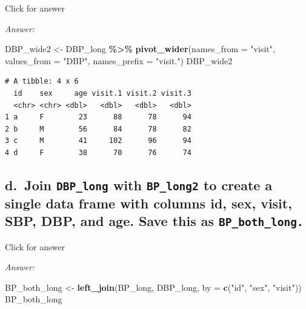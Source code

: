 \documentclass[
]{book}
\newenvironment{Shaded}{\begin{snugshade}}{\end{snugshade}}
\newcommand{\AttributeTok}[1]{\textcolor[rgb]{0.13,0.29,0.53}{#1}}
\newcommand{\FunctionTok}[1]{\textcolor[rgb]{0.13,0.29,0.53}{\textbf{#1}}}
\newcommand{\NormalTok}[1]{#1}
\newcommand{\OtherTok}[1]{\textcolor[rgb]{0.56,0.35,0.01}{#1}}
\newcommand{\SpecialCharTok}[1]{\textcolor[rgb]{0.81,0.36,0.00}{\textbf{#1}}}
\newcommand{\StringTok}[1]{\textcolor[rgb]{0.31,0.60,0.02}{#1}}
\begin{document}
Click for answer

\emph{Answer:}

\begin{Shaded}
\begin{Highlighting}[]
\NormalTok{DBP\_wide2 }\OtherTok{\textless{}{-}}\NormalTok{ DBP\_long }\SpecialCharTok{\%\textgreater{}\%} 
  \FunctionTok{pivot\_wider}\NormalTok{(}\AttributeTok{names\_from =} \StringTok{"visit"}\NormalTok{,}
              \AttributeTok{values\_from =} \StringTok{"DBP"}\NormalTok{,}
              \AttributeTok{names\_prefix =} \StringTok{"visit."}\NormalTok{)}
\NormalTok{DBP\_wide2}
\end{Highlighting}
\end{Shaded}

\begin{verbatim}
# A tibble: 4 x 6
  id    sex     age visit.1 visit.2 visit.3
  <chr> <chr> <dbl>   <dbl>   <dbl>   <dbl>
1 a     F        23      88      78      94
2 b     M        56      84      78      82
3 c     M        41     102      96      94
4 d     F        38      70      76      74
\end{verbatim}

\hypertarget{d.-join-dbp_long-with-bp_long2-to-create-a-single-data-frame-with-columns-id-sex-visit-sbp-dbp-and-age.-save-this-as-bp_both_long.}{%
\subsection{\texorpdfstring{d.~Join \texttt{DBP\_long} with \texttt{BP\_long2} to create a single data frame with columns id, sex, visit, SBP, DBP, and age. Save this as \texttt{BP\_both\_long.}}{d.~Join DBP\_long with BP\_long2 to create a single data frame with columns id, sex, visit, SBP, DBP, and age. Save this as BP\_both\_long.}}\label{d.-join-dbp_long-with-bp_long2-to-create-a-single-data-frame-with-columns-id-sex-visit-sbp-dbp-and-age.-save-this-as-bp_both_long.}}

Click for answer

\emph{Answer:}

\begin{Shaded}
\begin{Highlighting}[]
\NormalTok{BP\_both\_long }\OtherTok{\textless{}{-}} \FunctionTok{left\_join}\NormalTok{(BP\_long, DBP\_long, }\AttributeTok{by =} \FunctionTok{c}\NormalTok{(}\StringTok{"id"}\NormalTok{, }\StringTok{"sex"}\NormalTok{, }\StringTok{"visit"}\NormalTok{))}
\NormalTok{BP\_both\_long}
\end{Highlighting}
\end{Shaded}
\end{document}
